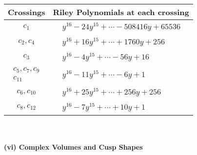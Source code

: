 \documentclass[1p]{elsarticle_modified}
\theoremstyle{definition}
\begin{document}
\begin{tabular}{m{50pt}|m{274pt}}
Crossings & \hspace{64pt}Riley Polynomials at each crossing \\
\hline $$\begin{aligned}c_{1}\end{aligned}$$&$\begin{aligned}
&y^{16}-24 y^{15}+\cdots-508416 y+65536
\end{aligned}$\\
\hline $$\begin{aligned}c_{2},c_{4}\end{aligned}$$&$\begin{aligned}
&y^{16}+16 y^{15}+\cdots+1760 y+256
\end{aligned}$\\
\hline $$\begin{aligned}c_{3}\end{aligned}$$&$\begin{aligned}
&y^{16}-4 y^{15}+\cdots-56 y+16
\end{aligned}$\\
\hline $$\begin{aligned}c_{5},c_{7},c_{9}\\c_{11}\end{aligned}$$&$\begin{aligned}
&y^{16}-11 y^{15}+\cdots-6 y+1
\end{aligned}$\\
\hline $$\begin{aligned}c_{6},c_{10}\end{aligned}$$&$\begin{aligned}
&y^{16}+25 y^{15}+\cdots+256 y+256
\end{aligned}$\\
\hline $$\begin{aligned}c_{8},c_{12}\end{aligned}$$&$\begin{aligned}
&y^{16}-7 y^{15}+\cdots+10 y+1
\end{aligned}$\\
\hline
\end{tabular}\\~\\
\newpage\flushleft \textbf{(vi) Complex Volumes and Cusp Shapes}
\end{document}
